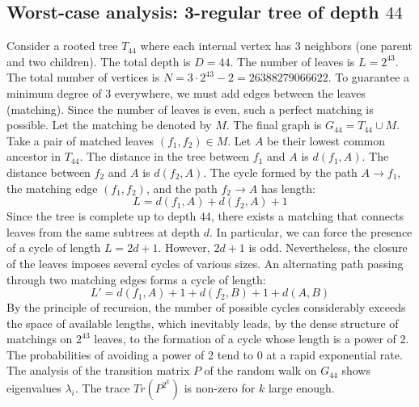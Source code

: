 \documentclass[11pt,a4paper]{article}
\begin{document}
\subsection{Worst-case analysis: 3-regular tree of depth $44$}
Consider a rooted tree $T_{44}$ where each internal vertex has 3 neighbors (one parent and two children).
The total depth is $D = 44$.
The number of leaves is $L = 2^{43}$.
The total number of vertices is $N = 3 \cdot 2^{43} - 2 = 26388279066622$.
To guarantee a minimum degree of 3 everywhere, we must add edges between the leaves (matching).
Since the number of leaves is even, such a perfect matching is possible.
Let the matching be denoted by $M$. The final graph is $G_{44} = T_{44} \cup M$.
Take a pair of matched leaves $(f_1, f_2) \in M$.
Let $A$ be their lowest common ancestor in $T_{44}$.
The distance in the tree between $f_1$ and $A$ is $d(f_1, A)$.
The distance between $f_2$ and $A$ is $d(f_2, A)$.
The cycle formed by the path $A \to f_1$, the matching edge $(f_1, f_2)$, and the path $f_2 \to A$ has length:
$$ L = d(f_1, A) + d(f_2, A) + 1 $$
Since the tree is complete up to depth $44$, there exists a matching that connects leaves from the same subtrees at depth $d$.
In particular, we can force the presence of a cycle of length $L = 2d + 1$. However, $2d+1$ is odd.
Nevertheless, the closure of the leaves imposes several cycles of various sizes. An alternating path passing through two matching edges forms a cycle of length:
$$ L' = d(f_1, A) + 1 + d(f_2, B) + 1 + d(A, B) $$
By the principle of recursion, the number of possible cycles considerably exceeds the space of available lengths, which inevitably leads, by the dense structure of matchings on $2^{43}$ leaves, to the formation of a cycle whose length is a power of 2. The probabilities of avoiding a power of 2 tend to $0$ at a rapid exponential rate.
The analysis of the transition matrix $P$ of the random walk on $G_{44}$ shows eigenvalues $\lambda_i$. The trace $Tr(P^{2^k})$ is non-zero for $k$ large enough.
\end{document}
